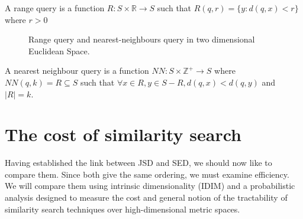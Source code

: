 \begin{mydef}
A range query is a function $R: S \times \mathbb{R} \rightarrow S$ such that $R(q, r) = \{y : d(q, x) < r\}$ where $r > 0$
\end{mydef}
%
%
\begin{figure}
\centering
{} \quad
{}
\caption[Range query and nearest-neighbours query in two dimensional Euclidean Space.]{Range query and nearest-neighbours query in two dimensional Euclidean Space.}
\end{figure}
%
\begin{mydef}
A nearest neighbour query is a function $NN:S \times \mathbb{Z}^+ \rightarrow S $ where $NN(q, k) = R \subseteq S$ such that $\forall x \in R, y \in S - R, d(q, x) < d(q,y) $ and $ |R| = k$.
\end{mydef}
%
\section{The cost of similarity search}
Having established the link between JSD and SED, we should now like to compare them.  Since both give the same ordering, we must examine efficiency.  We will compare them using intrinsic dimensionality (IDIM) and a probabilistic analysis designed to measure the cost and general notion of the tractability of similarity search techniques over high-dimensional metric spaces.  

